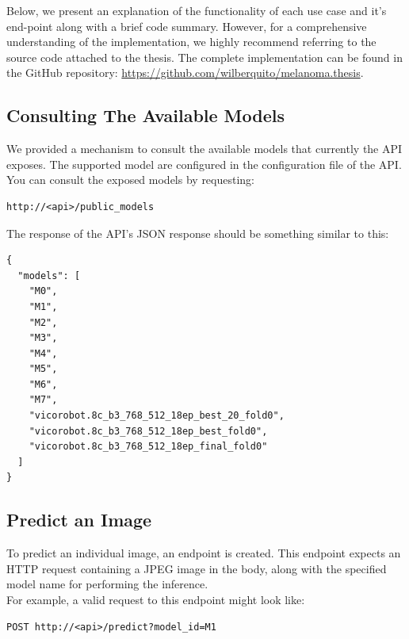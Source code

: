 Below, we present an explanation of the functionality of each use case and it's end-point along with a brief code summary.
However, for a comprehensive understanding of the implementation, we highly recommend referring to the source code attached to the thesis.
The complete implementation can be found in the GitHub repository: \url{https://github.com/wilberquito/melanoma.thesis}.

\subsection{Consulting The Available Models}

We provided a mechanism to consult the available models that currently the API exposes.
The supported model are configured in the configuration file of the API. \\

You can consult the exposed models by requesting:

\begin{Verbatim}[fontsize=\scriptsize]
http://<api>/public_models
\end{Verbatim}

The response of the API's JSON response should be something similar to this:

\begin{Verbatim}[fontsize=\scriptsize]
{
  "models": [
    "M0",
    "M1",
    "M2",
    "M3",
    "M4",
    "M5",
    "M6",
    "M7",
    "vicorobot.8c_b3_768_512_18ep_best_20_fold0",
    "vicorobot.8c_b3_768_512_18ep_best_fold0",
    "vicorobot.8c_b3_768_512_18ep_final_fold0"
  ]
}
\end{Verbatim}



\subsection{Predict an Image}

To predict an individual image, an endpoint is created.
This endpoint expects an HTTP request containing a JPEG image in the body,
along with the specified model name for performing the inference. \\

For example, a valid request to this endpoint might look like:

\begin{Verbatim}[fontsize=\scriptsize]
POST http://<api>/predict?model_id=M1
\end{Verbatim}

